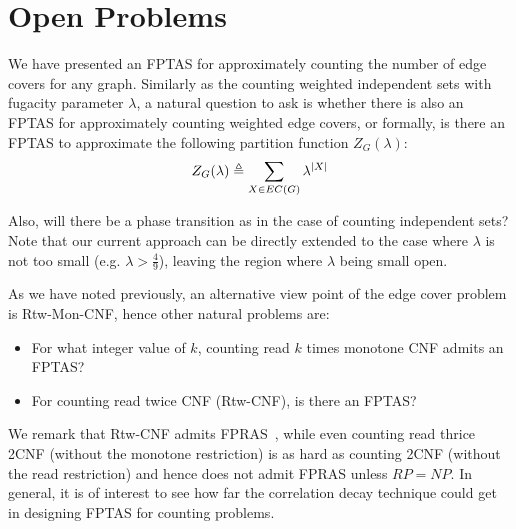 \section{Open Problems}
We have presented an FPTAS for approximately counting the number of edge covers for any graph. Similarly as the counting weighted independent sets with fugacity parameter $\lambda$, a natural question to ask is whether there is also an FPTAS for approximately counting weighted edge covers, or formally, is there an FPTAS to approximate the following partition function $Z_G(\lambda)$:
\[Z_G(\lambda) \triangleq \sum_{X \in EC(G)} \lambda^{\left\vert X\right\vert}\]

Also, will there be a phase transition as in the case of counting independent sets? Note that our current approach can be directly extended to the case where $\lambda$ is not too small (e.g. $\lambda > \frac{4}{9}$), leaving the region where $\lambda$ being small open.

As we have noted previously, an alternative view point of the edge cover problem is Rtw-Mon-CNF, hence other natural problems are:
\begin{itemize}
	\item For what integer value of $k$, counting read $k$ times monotone CNF admits an FPTAS?
	\item For counting read twice CNF (Rtw-CNF), is there an FPTAS?
\end{itemize}
We remark that Rtw-CNF admits FPRAS~\cite{TwiceSAT}, while even counting read thrice 2CNF (without the monotone restriction) is as hard as counting 2CNF (without the read restriction) and hence does not admit FPRAS unless $RP=NP$.
In general, it is of interest to see how far the correlation decay technique could get in designing FPTAS for counting problems.
